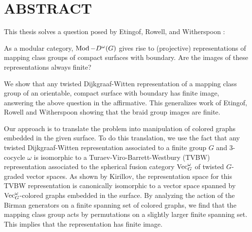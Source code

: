 %
%
%
%

\chapter*{ABSTRACT}

\pagestyle{plain} %
\setcounter{page}{2}

\indent
This thesis solves a question posed by Etingof, Rowell, and Witherspoon \cite{erw}:

\begin{displayquote}
  As a modular category, $\operatorname{Mod}-D^\omega(G)$ gives rise to (projective) representations of mapping class groups of compact surfaces with boundary.
  Are the images of these representations always finite?
\end{displayquote}

We show that any twisted Dijkgraaf-Witten representation of a mapping class group of an orientable, compact surface with boundary has finite image, answering the above question in the affirmative. This generalizes work of Etingof, Rowell and Witherspoon showing that the braid group images are finite.

Our approach is to translate the problem into manipulation of colored graphs embedded in the given surface. To do this translation, we use the fact that any twisted Dijkgraaf-Witten representation associated to a finite group $G$ and 3-cocycle $\omega$ is isomorphic to a Turaev-Viro-Barrett-Westbury (TVBW) representation associated to the spherical fusion category $\operatorname{Vec}_G^\omega$ of twisted $G$-graded vector spaces. As shown by Kirillov, the representation space for this TVBW representation is canonically isomorphic to a vector space spanned by $\operatorname{Vec}_G^\omega$-colored graphs embedded in the surface. By analyzing the action of the Birman generators on a finite spanning set of colored graphs, we find that the mapping class group acts by permutations on a slightly larger finite spanning set. This implies that the representation has finite image.
 

\pagebreak{}
